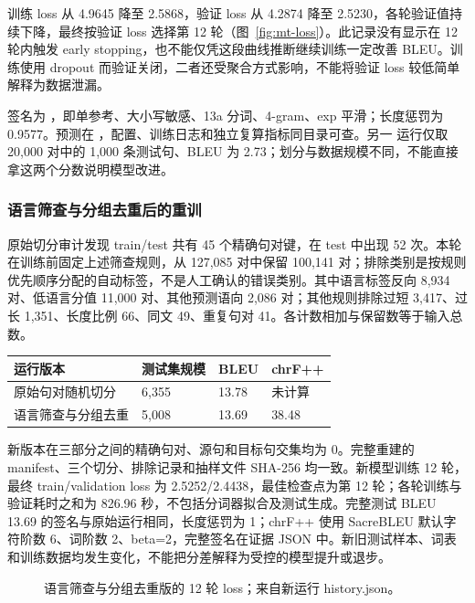 \documentclass[UTF8,a4paper,12pt,fontset=none]{ctexart}
\begin{document}
训练 loss 从 4.9645 降至 2.5868，验证 loss 从 4.2874 降至 2.5230，各轮验证值持续下降，最终按验证 loss 选择第 12 轮（图~\ref{fig:mt-loss}）。此记录没有显示在 12 轮内触发 early stopping，也不能仅凭这段曲线推断继续训练一定改善 BLEU。训练使用 dropout 而验证关闭，二者还受聚合方式影响，不能将验证 loss 较低简单解释为数据泄漏。

签名为 ，即单参考、大小写敏感、13a 分词、4-gram、exp 平滑；长度惩罚为 0.9577。预测在 ，配置、训练日志和独立复算指标同目录可查。另一  运行仅取 20,000 对中的 1,000 条测试句、BLEU 为 2.73；划分与数据规模不同，不能直接拿这两个分数说明模型改进。

\subsubsection{语言筛查与分组去重后的重训}
原始切分审计发现 train/test 共有 45 个精确句对键，在 test 中出现 52 次。本轮在训练前固定上述筛查规则，从 127,085 对中保留 100,141 对；排除类别是按规则优先顺序分配的自动标签，不是人工确认的错误类别。其中语言标签反向 8,934 对、低语言分值 11,000 对、其他预测语向 2,086 对；其他规则排除过短 3,417、过长 1,351、长度比例 66、同文 49、重复句对 41。各计数相加与保留数等于输入总数。

\noindent\begin{tabularx}{\textwidth}{YYYY}
\toprule
运行版本 & 测试集规模 & BLEU & chrF++ \\
\midrule
原始句对随机切分 & 6,355 & 13.78 & 未计算 \\
语言筛查与分组去重 & 5,008 & 13.69 & 38.48 \\
\bottomrule
\end{tabularx}

新版本在三部分之间的精确句对、源句和目标句交集均为 0。完整重建的 manifest、三个切分、排除记录和抽样文件 SHA-256 均一致。新模型训练 12 轮，最终 train/validation loss 为 2.5252/2.4438，最佳检查点为第 12 轮；各轮训练与验证耗时之和为 826.96 秒，不包括分词器拟合及测试生成。完整测试 BLEU 13.69 的签名与原始运行相同，长度惩罚为 1；chrF++ 使用 SacreBLEU 默认字符阶数 6、词阶数 2、beta=2，完整签名在证据 JSON 中。新旧测试样本、词表和训练数据均发生变化，不能把分差解释为受控的模型提升或退步。

\begin{figure}[htbp]
\centering
{}
\caption{语言筛查与分组去重版的 12 轮 loss；来自新运行 history.json。}
\end{figure}
\end{document}
